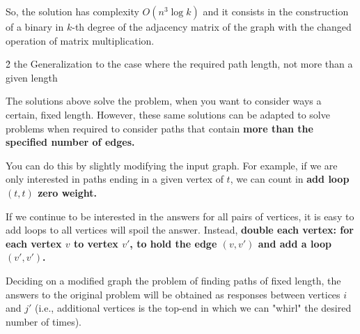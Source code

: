 So, the solution has complexity $O (n^3 \log k)$ and it consists in the construction of a binary in $k$-th degree of the adjacency matrix of the graph with the changed operation of matrix multiplication.


\h2{ the Generalization to the case where the required path length, not more than a given length }

The solutions above solve the problem, when you want to consider ways a certain, fixed length. However, these same solutions can be adapted to solve problems when required to consider paths that contain \bf{more} than the specified number of edges.

You can do this by slightly modifying the input graph. For example, if we are only interested in paths ending in a given vertex of $t$, we can count in \bf{add loop} $(t,t)$ zero weight.

If we continue to be interested in the answers for all pairs of vertices, it is easy to add loops to all vertices will spoil the answer. Instead, \bf{double} each vertex: for each vertex $v$ to vertex $v'$, to hold the edge $(v,v')$ and add a loop $(v',v')$.

Deciding on a modified graph the problem of finding paths of fixed length, the answers to the original problem will be obtained as responses between vertices $i$ and $j'$ (i.e., additional vertices is the top-end in which we can "whirl" the desired number of times).


